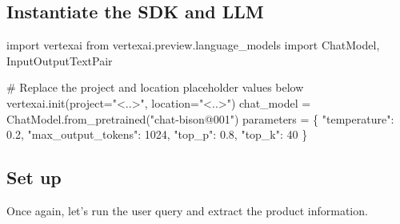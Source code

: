 \documentclass[
  letterpaper,
  DIV=11,
  numbers=noendperiod]{scrreprt}
\newenvironment{Shaded}{\begin{snugshade}}{\end{snugshade}}
\newcommand{\CommentTok}[1]{\textcolor[rgb]{0.37,0.37,0.37}{#1}}
\newcommand{\DecValTok}[1]{\textcolor[rgb]{0.68,0.00,0.00}{#1}}
\newcommand{\FloatTok}[1]{\textcolor[rgb]{0.68,0.00,0.00}{#1}}
\newcommand{\ImportTok}[1]{\textcolor[rgb]{0.00,0.46,0.62}{#1}}
\newcommand{\NormalTok}[1]{\textcolor[rgb]{0.00,0.23,0.31}{#1}}
\newcommand{\OperatorTok}[1]{\textcolor[rgb]{0.37,0.37,0.37}{#1}}
\newcommand{\StringTok}[1]{\textcolor[rgb]{0.13,0.47,0.30}{#1}}
\begin{document}
\hypertarget{instantiate-the-sdk-and-llm}{%
\subsection{Instantiate the SDK and
LLM}\label{instantiate-the-sdk-and-llm}}

\begin{Shaded}
\begin{Highlighting}[]
\ImportTok{import}\NormalTok{ vertexai}
\ImportTok{from}\NormalTok{ vertexai.preview.language\_models }\ImportTok{import}\NormalTok{ ChatModel, InputOutputTextPair}

\CommentTok{\# Replace the project and location placeholder values below}
\NormalTok{vertexai.init(project}\OperatorTok{=}\StringTok{"\textless{}..\textgreater{}"}\NormalTok{, location}\OperatorTok{=}\StringTok{"\textless{}..\textgreater{}"}\NormalTok{)}
\NormalTok{chat\_model }\OperatorTok{=}\NormalTok{ ChatModel.from\_pretrained(}\StringTok{"chat{-}bison@001"}\NormalTok{)}
\NormalTok{parameters }\OperatorTok{=}\NormalTok{ \{}
    \StringTok{"temperature"}\NormalTok{: }\FloatTok{0.2}\NormalTok{,}
    \StringTok{"max\_output\_tokens"}\NormalTok{: }\DecValTok{1024}\NormalTok{,}
    \StringTok{"top\_p"}\NormalTok{: }\FloatTok{0.8}\NormalTok{,}
    \StringTok{"top\_k"}\NormalTok{: }\DecValTok{40}
\NormalTok{\}}
\end{Highlighting}
\end{Shaded}

\hypertarget{set-up}{%
\subsection{Set up}\label{set-up}}

Once again, let's run the user query and extract the product
information.
\end{document}
